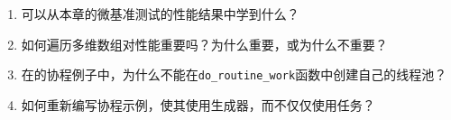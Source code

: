 \begin{enumerate}
\item
可以从本章的微基准测试的性能结果中学到什么？

\item
如何遍历多维数组对性能重要吗？为什么重要，或为什么不重要？

\item
在的协程例子中，为什么不能在\texttt{do\_routine\_work}函数中创建自己的线程池？

\item
如何重新编写协程示例，使其使用生成器，而不仅仅使用任务？
\end{enumerate}